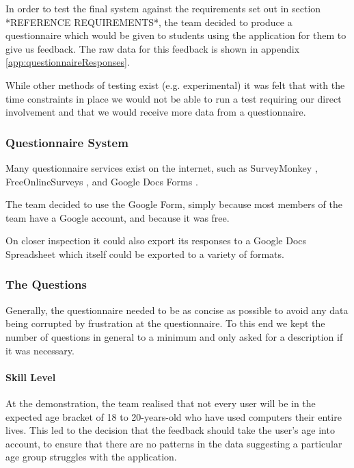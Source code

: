 In order to test the final system against the requirements set out in
section *REFERENCE REQUIREMENTS*, the team decided to produce a
questionnaire which would be given to students using the application
for them to give us feedback.
The raw data for this feedback is shown in appendix
\ref{app:questionnaireResponses}.

While other methods of testing exist (e.g. experimental) it was felt
that with the time constraints in place we would not be able to run a
test requiring our direct involvement and that we would receive more
data from a questionnaire.

\subsubsection{Questionnaire System}

Many questionnaire services exist on the internet, such as
SurveyMonkey \cite{surveyMonkey}, FreeOnlineSurveys
\cite{freeOnlineSurveys}, and Google Docs Forms
\cite{googleDocsForms}.

The team decided to use the Google Form, simply because most members
of the team have a Google account, and because it was free.

On closer inspection it could also export its responses to a Google
Docs Spreadsheet which itself could be exported to a variety of
formats.

\subsubsection{The Questions}

Generally, the questionnaire needed to be as concise as possible to
avoid any data being corrupted by frustration at the questionnaire.
To this end we kept the number of questions in general to a minimum
and only asked for a description if it was necessary.

\paragraph{Skill Level}
At the demonstration, the team realised that not every user will be in
the expected age bracket of 18 to 20-years-old who have used computers
their entire lives.
This led to the decision that the feedback should take the user's age
into account, to ensure that there are no patterns in the data
suggesting a particular age group struggles with the application.

